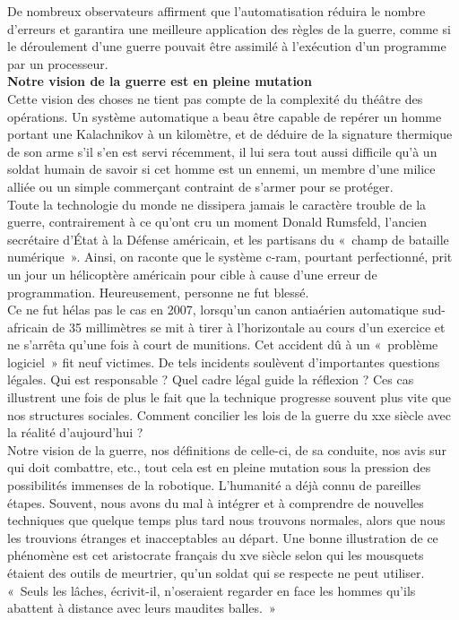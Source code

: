 \documentclass[8pt]{article}
\begin{document}
De nombreux observateurs affirment que l’automatisation réduira le nombre d’erreurs et garantira une meilleure application des règles de la guerre, comme si le déroulement d’une guerre pouvait être assimilé à l’exécution d’un programme par un processeur.\\

\textbf{Notre vision de la guerre est en pleine mutation}\\

Cette vision des choses ne tient pas compte de la complexité du théâtre des opérations. Un système automatique a beau être capable de repérer un homme portant une Kalachnikov à un kilomètre, et de déduire de la signature thermique de son arme s’il s’en est servi récemment, il lui sera tout aussi difficile qu’à un soldat humain de savoir si cet homme est un ennemi, un membre d’une milice alliée ou un simple commerçant contraint de s’armer pour se protéger.\\

Toute la technologie du monde ne dissipera jamais le caractère trouble de la guerre, contrairement à ce qu’ont cru un moment Donald Rumsfeld, l’ancien secrétaire d’État à la Défense américain, et les partisans du «~champ de bataille numérique~». Ainsi, on raconte que le système c-ram, pourtant perfectionné, prit un jour un hélicoptère américain pour cible à cause d’une erreur de programmation. Heureusement, personne ne fut blessé.\\

Ce ne fut hélas pas le cas en 2007, lorsqu’un canon antiaérien automatique sud-africain de 35 millimètres se mit à tirer à l’horizontale au cours d’un exercice et ne s’arrêta qu’une fois à court de munitions. Cet accident dû à un «~problème logiciel~» fit neuf victimes. De tels incidents soulèvent d’importantes questions légales. Qui est responsable ? Quel cadre légal guide la réflexion ? Ces cas illustrent une fois de plus le fait que la technique progresse souvent plus vite que nos structures sociales. Comment concilier les lois de la guerre du xxe siècle avec la réalité d’aujourd’hui ?\\

Notre vision de la guerre, nos définitions de celle-ci, de sa conduite, nos avis sur qui doit combattre, etc., tout cela est en pleine mutation sous la pression des possibilités immenses de la robotique. L’humanité a déjà connu de pareilles étapes. Souvent, nous avons du mal à intégrer et à comprendre de nouvelles techniques que quelque temps plus tard nous trouvons normales, alors que nous les trouvions étranges et inacceptables au départ. Une bonne illustration de ce phénomène est cet aristocrate français du xve siècle selon qui les mousquets étaient des outils de meurtrier, qu’un soldat qui se respecte ne peut utiliser. «~Seuls les lâches, écrivit-il, n’oseraient regarder en face les hommes qu’ils abattent à distance avec leurs maudites balles.~»\\
\end{document}
